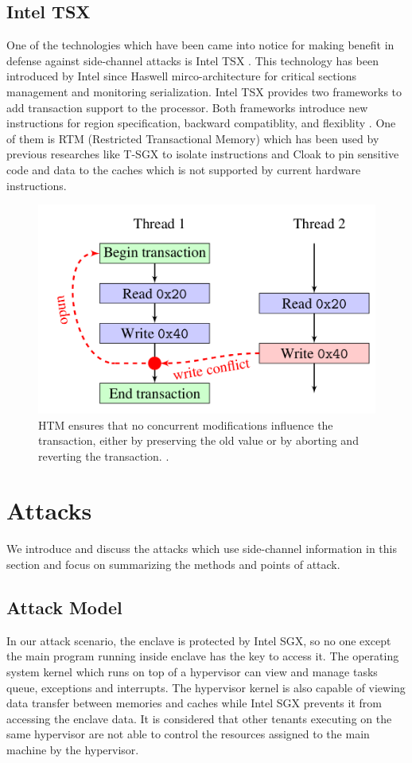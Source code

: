 \subsection{Intel TSX}
One of the technologies which have been came into notice for making benefit in defense against side-channel attacks is Intel TSX \cite{tsx}. This technology has been introduced by Intel since Haswell mirco-architecture \cite{haswell} for critical sections management and monitoring serialization. Intel TSX provides two frameworks to add transaction support to the processor. Both frameworks introduce new instructions for region specification, backward compatiblity, and flexiblity \cite{tsx}. One of them is RTM (Restricted Transactional Memory) \cite{rtm} which has been used by previous researches like T-SGX \cite{tsgx} to isolate instructions and Cloak \cite{cloak} to pin sensitive code and data to the caches which is not supported by current hardware instructions.

\begin{figure}
	\includegraphics[scale=0.2]{images/rtm}
	\caption{HTM ensures that no concurrent modifications influence the transaction, either by preserving the old value or by aborting and reverting the transaction. \cite{cloak}.}
	\label{fig:rtm}
\end{figure}


\section{Attacks}
We introduce and discuss the attacks which use side-channel information in this section and focus on summarizing the methods and points of attack.

\subsection{Attack Model}
In our attack scenario, the enclave is protected by Intel SGX, so no one except the main program running inside enclave has the key to access it. The operating system kernel which runs on top of a hypervisor can view and manage tasks queue, exceptions and interrupts. The hypervisor kernel is also capable of viewing data transfer between memories and caches while Intel SGX prevents it from accessing the enclave data. It is considered that other tenants executing on the same hypervisor are not able to control the resources assigned to the main machine by the hypervisor.

